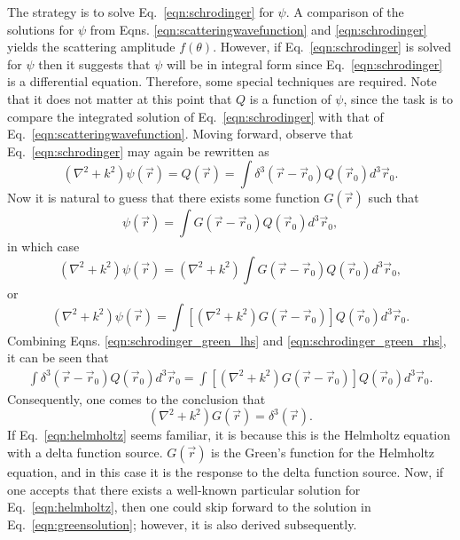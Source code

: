 The strategy is to solve Eq.~\eqref{eqn:schrodinger} for $\psi$. A comparison of the solutions for $\psi$ from Eqns. \ref{eqn:scatteringwavefunction} and \ref{eqn:schrodinger} yields the scattering amplitude $f(\theta)$. However, if Eq.~\eqref{eqn:schrodinger} is solved for $\psi$ then it suggests that $\psi$ will be in integral form since  Eq.~\eqref{eqn:schrodinger} is a differential equation. Therefore, some special techniques are required. Note that it does not matter at this point that $Q$ is a function of $\psi$, since the task is to compare the integrated solution of Eq.~\eqref{eqn:schrodinger} with that of Eq.~\eqref{eqn:scatteringwavefunction}. Moving forward, observe  that Eq.~\eqref{eqn:schrodinger} may again be rewritten as
%
\begin{equation} \label{eqn:schrodinger_green_lhs}
(\nabla^2+k^2)\psi(\vec{r})=Q (\vec{r}) =\int \delta^3(\vec{r}-\vec{r}_0)Q(\vec{r}_0)d^3\vec{r}_0.
\end{equation}
Now it is natural to guess that there exists some function $G(\vec{r})$ such that
%
\begin{equation}
\label{eqn:psigreen}
\psi(\vec{r})=\int G(\vec{r}-\vec{r}_0)Q(\vec{r}_0)d^3\vec{r}_0,
\end{equation}
in which case
%
\begin{equation} \nonumber
(\nabla^2+k^2)\psi(\vec{r})=(\nabla^2+k^2)\int G(\vec{r}-\vec{r}_0)Q(\vec{r}_0) d^3\vec{r}_0,
\end{equation}
or
\begin{equation} \label{eqn:schrodinger_green_rhs}
(\nabla^2+k^2)\psi(\vec{r})=\int \left[(\nabla^2+k^2)G(\vec{r}-\vec{r}_0)\right]Q(\vec{r}_0) d^3\vec{r}_0.
\end{equation}
%
Combining Eqns. \ref{eqn:schrodinger_green_lhs} and \ref{eqn:schrodinger_green_rhs}, it can be seen that
\begin{align*}
\int \delta^3(\vec{r}-\vec{r}_0)Q(\vec{r}_0)d^3\vec{r}_0=\int \left[(\nabla^2+k^2)G(\vec{r}-\vec{r}_0)\right]Q(\vec{r}_0) d^3\vec{r}_0.
\end{align*}
Consequently, one comes to the conclusion that
%
\begin{equation}
\label{eqn:helmholtz}
(\nabla^2+k^2)G(\vec{r})=\delta^3(\vec{r}).
\end{equation}
If Eq.~\eqref{eqn:helmholtz} seems familiar, it is because this is the Helmholtz equation with a delta function source. $G(\vec{r})$ is the Green's function for the Helmholtz equation, and in this case it is the response to the delta function source. Now, if one accepts that there exists a well-known particular solution for Eq.~\eqref{eqn:helmholtz}, then one could skip forward to the solution in Eq.~\eqref{eqn:greensolution}; however, it is also derived subsequently.

